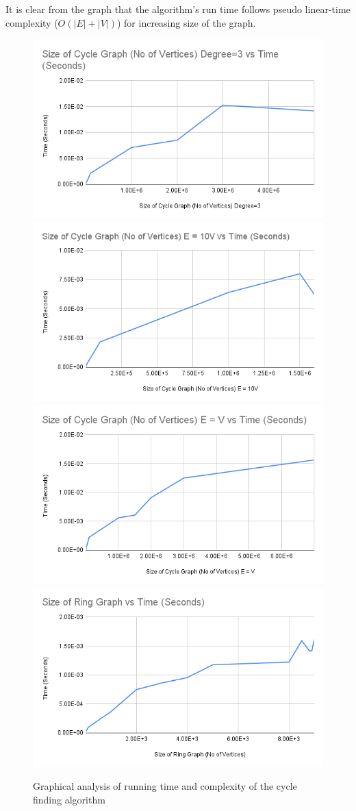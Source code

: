 \documentclass{article}
\begin{document}
It is clear from the graph that the algorithm's run time follows pseudo linear-time complexity  (\textit{$O(|E|+|V|)$}) for increasing size of the graph.
\begin{figure}[htp]
    \includegraphics[width=.50\textwidth]{Size of Cycle Graph (No of Vertices) Degree=3 vs Time (Seconds).png}\hfill
    \includegraphics[width=.50\textwidth]{Size of Cycle Graph (No of Vertices) E = 10V vs Time (Seconds).png}\hfill
    \\[\smallskipamount]
    \includegraphics[width=.50\textwidth]{Size of Cycle Graph (No of Vertices) E = V vs Time (Seconds).png}\hfill
    \includegraphics[width=.50\textwidth]{Size of Ring Graph vs Time (Seconds).png}\hfill
    \caption{Graphical analysis of running time and complexity of the cycle finding algorithm}\label{fig:findcycle}
\end{figure}
\end{document}
